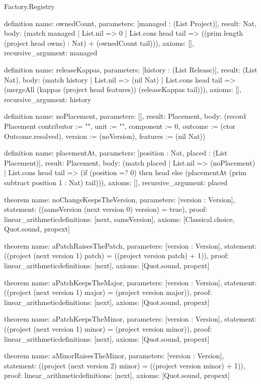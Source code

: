 \begin{lexlean}{Factory.Registry}
\begin{semanticmodule}
definition{
  name: ownedCount,
  parameters: [managed : (List Project)],
  result: Nat,
  body: (match managed
    | List.nil => 0
    | List.cons head tail => ((prim length (project head owns) : Nat) + (ownedCount tail))),
  axioms: [],
  recursive_argument: managed
}

definition{
  name: releaseKappas,
  parameters: [history : (List Release)],
  result: (List Nat),
  body: (match history
    | List.nil => (nil Nat)
    | List.cons head tail => (mergeAll (kappas (project head features)) (releaseKappas tail))),
  axioms: [],
  recursive_argument: history
}

definition{
  name: noPlacement,
  parameters: [],
  result: Placement,
  body: (record Placement {contributor := "", unit := "", component := 0, outcome := (ctor Outcome.resolved), version := (noVersion), features := (nil Nat)})
}

definition{
  name: placementAt,
  parameters: [position : Nat, placed : (List Placement)],
  result: Placement,
  body: (match placed
    | List.nil => (noPlacement)
    | List.cons head tail => (if (position =? 0) then head else (placementAt (prim subtract position 1 : Nat) tail))),
  axioms: [],
  recursive_argument: placed
}

theorem{
  name: noChangeKeepsTheVersion,
  parameters: [version : Version],
  statement: ((sameVersion (next version 0) version) = true),
  proof: linear_arithmetic{definitions: [next, sameVersion]},
  axioms: [Classical.choice, Quot.sound, propext]
}

theorem{
  name: aPatchRaisesThePatch,
  parameters: [version : Version],
  statement: ((project (next version 1) patch) = ((project version patch) + 1)),
  proof: linear_arithmetic{definitions: [next]},
  axioms: [Quot.sound, propext]
}

theorem{
  name: aPatchKeepsTheMajor,
  parameters: [version : Version],
  statement: ((project (next version 1) major) = (project version major)),
  proof: linear_arithmetic{definitions: [next]},
  axioms: [Quot.sound, propext]
}

theorem{
  name: aPatchKeepsTheMinor,
  parameters: [version : Version],
  statement: ((project (next version 1) minor) = (project version minor)),
  proof: linear_arithmetic{definitions: [next]},
  axioms: [Quot.sound, propext]
}

theorem{
  name: aMinorRaisesTheMinor,
  parameters: [version : Version],
  statement: ((project (next version 2) minor) = ((project version minor) + 1)),
  proof: linear_arithmetic{definitions: [next]},
  axioms: [Quot.sound, propext]
}


\end{semanticmodule}
\end{lexlean}
